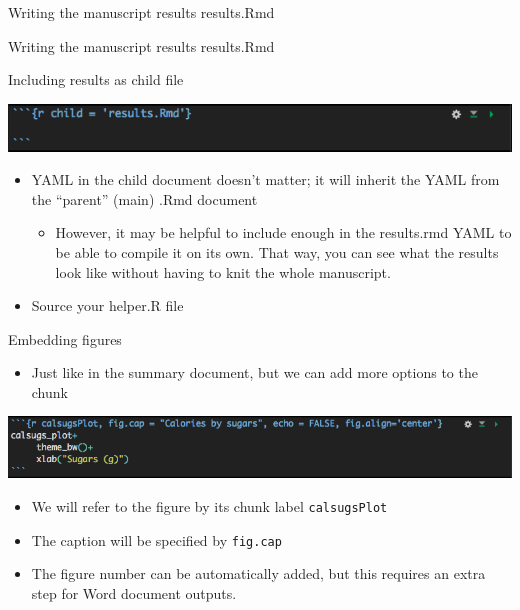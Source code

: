 \documentclass[
  ignorenonframetext,
]{beamer}
\providecommand{\tightlist}{%
  \setlength{\itemsep}{0pt}\setlength{\parskip}{0pt}}
\begin{document}
\begin{frame}[fragile]{Writing the manuscript results \textbar{}
results.Rmd}
\protect\hypertarget{writing-the-manuscript-results-results.rmd}{}

\begin{block}{Writing the manuscript results \textbar{} results.Rmd}

\end{block}

\begin{block}{Including results as child file}

\includegraphics{images/child.png}

\begin{itemize}
\tightlist
\item
  YAML in the child document doesn't matter; it will inherit the YAML
  from the ``parent'' (main) .Rmd document

  \begin{itemize}
  \tightlist
  \item
    However, it may be helpful to include enough in the results.rmd YAML
    to be able to compile it on its own. That way, you can see what the
    results look like without having to knit the whole manuscript.
  \end{itemize}
\item
  Source your helper.R file
\end{itemize}

\end{block}

\begin{block}{Embedding figures}

\begin{itemize}
\tightlist
\item
  Just like in the summary document, but we can add more options to the
  chunk
\end{itemize}

\includegraphics{images/fig_chunk.png}

\begin{itemize}
\tightlist
\item
  We will refer to the figure by its chunk label \texttt{calsugsPlot}
\item
  The caption will be specified by \texttt{fig.cap}
\item
  The figure number can be automatically added, but this requires an
  extra step for Word document outputs.
\end{itemize}


\end{block}
\end{frame}
\end{document}
